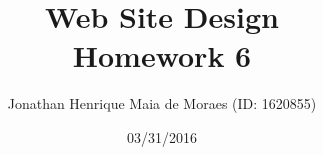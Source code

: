 \title{Web Site Design \\ Homework 6}
\author{Jonathan Henrique Maia de Moraes (ID: 1620855)}
\date{03/31/2016}
\maketitle

